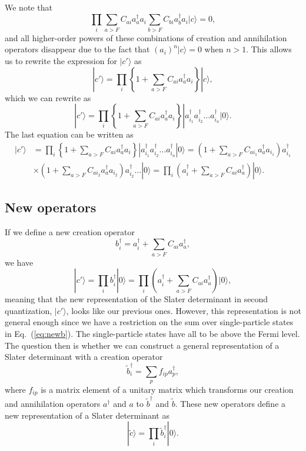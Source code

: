 \documentclass[graybox,sectrefs,envcountresetchap,open=right]{svmonodo}
\begin{document}
We note that
\[
\prod_{i}\sum_{a>F}C_{ai}a_{a}^{\dagger}a_{i}\sum_{b>F}C_{bi}a_{b}^{\dagger}a_{i}| c\rangle =0,
\]
and all higher-order powers of these combinations of creation and annihilation operators disappear 
due to the fact that $(a_i)^n| c\rangle =0$ when $n > 1$. This allows us to rewrite the expression for $|c'\rangle $ as
\[
|c'\rangle=\prod_{i}\left\{1+\sum_{a>F}C_{ai}a_{a}^{\dagger}a_{i}\right\}| c\rangle,
\]
which we can rewrite as 
\[
|c'\rangle=\prod_{i}\left\{1+\sum_{a>F}C_{ai}a_{a}^{\dagger}a_{i}\right\}| a^{\dagger}_{i_1} a^{\dagger}_{i_2} \dots a^{\dagger}_{i_n}|0\rangle.
\]
The last equation can be written as
\begin{align}
|c'\rangle&=\prod_{i}\left\{1+\sum_{a>F}C_{ai}a_{a}^{\dagger}a_{i}\right\}| a^{\dagger}_{i_1} a^{\dagger}_{i_2} \dots a^{\dagger}_{i_n}|0\rangle=\left(1+\sum_{a>F}C_{ai_1}a_{a}^{\dagger}a_{i_1}\right)a^{\dagger}_{i_1} \\
& \times\left(1+\sum_{a>F}C_{ai_2}a_{a}^{\dagger}a_{i_2}\right)a^{\dagger}_{i_2} \dots |0\rangle=\prod_{i}\left(a^{\dagger}_{i}+\sum_{a>F}C_{ai}a_{a}^{\dagger}\right)|0\rangle.
\end{align}



\subsection{New operators}


If we define a new creation operator 
\begin{equation}
b^{\dagger}_{i}=a^{\dagger}_{i}+\sum_{a>F}C_{ai}a_{a}^{\dagger}, \label{eq:newb}
\end{equation}
we have 
\[
|c'\rangle=\prod_{i}b^{\dagger}_{i}|0\rangle=\prod_{i}\left(a^{\dagger}_{i}+\sum_{a>F}C_{ai}a_{a}^{\dagger}\right)|0\rangle,
\]
meaning that the new representation of the Slater determinant in second quantization, $|c'\rangle$, looks like our previous ones. However, this representation is not general enough since we have a restriction on the sum over single-particle states in Eq.~(\ref{eq:newb}). The single-particle states have all to be above the Fermi level.
The question then is whether we can construct a general representation of a Slater determinant with a creation operator 
\[
\tilde{b}^{\dagger}_{i}=\sum_{p}f_{ip}a_{p}^{\dagger},
\]
where $f_{ip}$ is a matrix element of a unitary matrix which transforms our creation and annihilation operators
$a^{\dagger}$ and $a$ to $\tilde{b}^{\dagger}$ and $\tilde{b}$. These new operators define a new representation of a Slater determinant as
\[
|\tilde{c}\rangle=\prod_{i}\tilde{b}^{\dagger}_{i}|0\rangle.
\]
\end{document}
